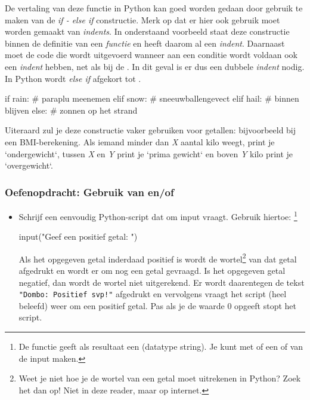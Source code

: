 \documentclass[a4paper,11pt, fleqn]{article}
\begin{document}
De vertaling van deze functie in Python kan goed worden gedaan door gebruik te maken van de \textit{if - else if} constructie. Merk op dat er hier ook gebruik moet worden gemaakt van \textit{indents}. In onderstaand voorbeeld staat deze constructie binnen de definitie van een \textit{functie} en heeft daarom al een \textit{indent}. Daarnaast moet de code die wordt uitgevoerd wanneer aan een conditie wordt voldaan ook een \textit{indent} hebben, net als bij de . In dit geval is er dus een dubbele \textit{indent} nodig. In Python wordt \textit{else if} afgekort tot . 

\begin{python}
if rain:
    # paraplu meenemen
elif snow:
    # sneeuwballengevect
elif hail:
    # binnen blijven
else:
    # zonnen op het strand
\end{python}

Uiteraard zul je deze constructie vaker gebruiken voor getallen: bijvoorbeeld bij een BMI-berekening. Als iemand minder dan \textit{X} aantal kilo weegt, print je `ondergewicht`, tussen \textit{X} en \textit{Y} print je `prima gewicht` en boven \textit{Y} kilo print je `overgewicht`. 

\subsubsection*{Oefenopdracht: Gebruik van  en/of } 

\begin{itemize}
\item Schrijf een eenvoudig Python-script dat om input vraagt. Gebruik hiertoe: \footnote{De functie  geeft als resultaat een  (datatype string). Je kunt met  of  een  of  van de input maken.}
\begin{python}
input("Geef een positief getal: ")
\end{python}
Als het opgegeven getal inderdaad positief is wordt de wortel\footnote{Weet je niet hoe je de wortel van een getal moet uitrekenen in Python? Zoek het dan op! Niet in deze reader, maar op internet.} van dat getal afgedrukt en wordt er om nog een getal gevraagd. 
Is het opgegeven getal negatief, dan wordt de wortel niet uitgerekend. Er wordt daarentegen de tekst \verb."Dombo: Positief svp!". afgedrukt en vervolgens vraagt het script (heel beleefd) weer om een positief getal. Pas als je de waarde 0 opgeeft stopt het script.
\end{itemize}
\end{document}
